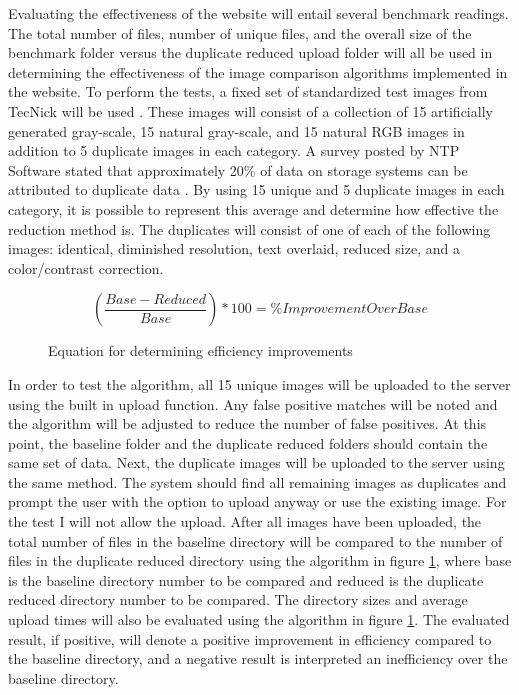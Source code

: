 \documentclass[11pt]{article}
\begin{document}

Evaluating the effectiveness of the website will entail several benchmark readings. The total number of files, number of unique files, and the overall size of the benchmark folder versus the duplicate reduced upload folder will all be used in determining the effectiveness of the image comparison algorithms implemented in the website. To perform the tests, a fixed set of standardized test images from TecNick will be used \cite{tecnick:testimage}. These images will consist of a collection of 15 artificially generated gray-scale, 15 natural gray-scale, and 15 natural RGB images in addition to 5 duplicate images in each category. A survey posted by NTP Software stated that approximately 20\% of data on storage systems can be attributed to duplicate data \cite{ntps:staledata}. By using 15 unique and 5 duplicate images in each category, it is possible to represent this average and determine how effective the reduction method is. The duplicates will consist of one of each of the following images: identical, diminished resolution, text overlaid, reduced size, and a color/contrast correction.

\begin{figure}[htbp]
\centering
\[\left ( \frac{Base - Reduced}{Base} \right ) * 100 = \% Improvement Over Base\]
\caption{Equation for determining efficiency improvements}
\label{benchmark_eq}
\end{figure}

In order to test the algorithm, all 15 unique images will be uploaded to the server using the built in upload function. Any false positive matches will be noted and the algorithm will be adjusted to reduce the number of false positives. At this point, the baseline folder and the duplicate reduced folders should contain the same set of data. Next, the duplicate images will be uploaded to the server using the same method. The system should find all remaining images as duplicates and prompt the user with the option to upload anyway or use the existing image. For the test I will not allow the upload. After all images have been uploaded, the total number of files in the baseline directory will be compared to the number of files in the duplicate reduced directory using the algorithm in figure \ref{benchmark_eq}, where base is the baseline directory number to be compared and reduced is the duplicate reduced directory number to be compared.  The directory sizes and average upload times will also be evaluated using the algorithm in figure \ref{benchmark_eq}. The evaluated result, if positive, will denote a positive improvement in efficiency compared to the baseline directory, and a negative result is interpreted an inefficiency over the baseline directory.
\end{document}
